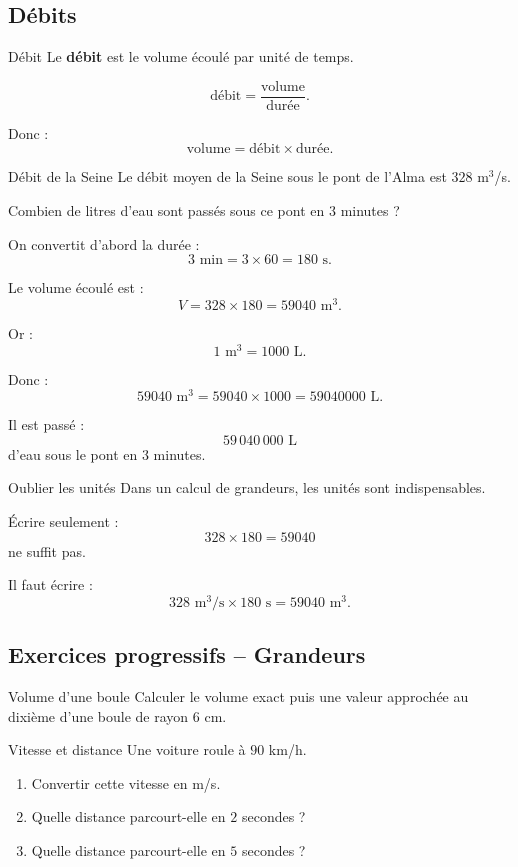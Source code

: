 \documentclass[11pt,a4paper]{article}
\begin{document}
\subsection{Débits}

\begin{definitionbox}{Débit}
Le \textbf{débit} est le volume écoulé par unité de temps.

\[
\text{débit}=\frac{\text{volume}}{\text{durée}}.
\]

Donc :
\[
\text{volume}=\text{débit}\times \text{durée}.
\]
\end{definitionbox}

\begin{examplebox}{Débit de la Seine}
Le débit moyen de la Seine sous le pont de l'Alma est $328$ m$^3$/s.

Combien de litres d'eau sont passés sous ce pont en $3$ minutes ?

On convertit d'abord la durée :
\[
3\text{ min}=3\times 60=180\text{ s}.
\]

Le volume écoulé est :
\[
V=328\times 180=59040\text{ m}^3.
\]

Or :
\[
1\text{ m}^3=1000\text{ L}.
\]

Donc :
\[
59040\text{ m}^3=59040\times 1000=59040000\text{ L}.
\]

Il est passé :
\[
59\,040\,000\text{ L}
\]
d'eau sous le pont en $3$ minutes.
\end{examplebox}

\begin{warningbox}{Oublier les unités}
Dans un calcul de grandeurs, les unités sont indispensables.

Écrire seulement :
\[
328\times 180=59040
\]
ne suffit pas.

Il faut écrire :
\[
328\text{ m}^3/\text{s}\times 180\text{ s}=59040\text{ m}^3.
\]
\end{warningbox}

\subsection{Exercices progressifs -- Grandeurs}

\begin{exercisebox}{Volume d'une boule}
Calculer le volume exact puis une valeur approchée au dixième d'une boule de rayon $6$ cm.
\end{exercisebox}

\begin{exercisebox}{Vitesse et distance}
Une voiture roule à $90$ km/h.

\begin{enumerate}
    \item Convertir cette vitesse en m/s.
    \item Quelle distance parcourt-elle en $2$ secondes ?
    \item Quelle distance parcourt-elle en $5$ secondes ?
\end{enumerate}
\end{exercisebox}
\end{document}
